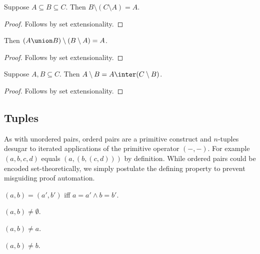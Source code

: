 \begin{proposition}\label{double_complement}
    Suppose $A\subseteq B\subseteq C$.
    Then $B\setminus (C\setminus A) = A$.
\end{proposition}
\begin{proof}
    Follows by set extensionality.
\end{proof}

\begin{proposition}\label{double_complement_union}
    Then $(A\union B)\setminus (B\setminus A) = A$.
\end{proposition}
\begin{proof}
    Follows by set extensionality.
\end{proof}

\begin{proposition}\label{setminus_eq_inter_complement}
    Suppose $A, B\subseteq C$.
    Then $A\setminus B = A\inter (C\setminus B)$.
\end{proposition}
\begin{proof}
    Follows by set extensionality.
\end{proof}

\subsection{Tuples}

As with unordered pairs,
orderd pairs are a primitive construct and
$n$-tuples desugar to iterated applications of the
primitive operator $({-},{-})$.
For example $(a, b, c, d)$ equals $(a, (b, (c, d)))$ by definition.
While ordered pairs could be encoded set-theoretically, %
we simply postulate the defining property to prevent misguiding
proof automation.

\begin{axiom}\label{pair_eq_iff}
    $(a, b) = (a', b')$ iff $a = a'\land b = b'$.
\end{axiom}

\begin{axiom}\label{pair_neq_emptyset}
    $(a, b) \neq \emptyset$.
\end{axiom}

\begin{axiom}\label{pair_neq_fst}
    $(a, b) \neq a$.
\end{axiom}

\begin{axiom}\label{pair_neq_snd}
    $(a, b) \neq b$.
\end{axiom}

